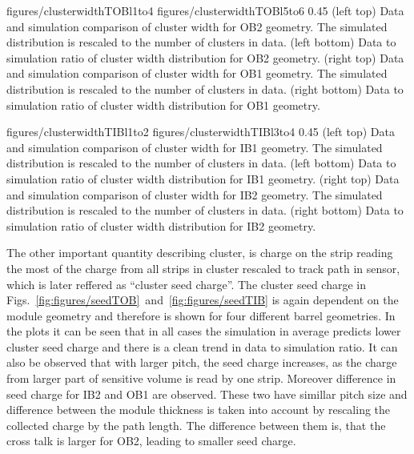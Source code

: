                  {figures/clusterwidthTOBl1to4}
                 {figures/clusterwidthTOBl5to6} %
                 {0.45}       %
                 {(left top) Data and simulation comparison of cluster width for OB2 geometry. The simulated distribution is rescaled to the number of clusters in data. (left bottom) Data to simulation ratio of cluster width distribution for OB2 geometry. (right top) Data and simulation comparison of cluster width for OB1 geometry. The simulated distribution is rescaled to the number of clusters in data. (right bottom) Data to simulation ratio of cluster width distribution for OB1 geometry. }

                 {figures/clusterwidthTIBl1to2}
                 {figures/clusterwidthTIBl3to4} %
                 {0.45}       %
                 {(left top) Data and simulation comparison of cluster width for IB1 geometry. The simulated distribution is rescaled to the number of clusters in data. (left bottom) Data to simulation ratio of cluster width distribution for IB1 geometry. (right top) Data and simulation comparison of cluster width for IB2 geometry. The simulated distribution is rescaled to the number of clusters in data. (right bottom) Data to simulation ratio of cluster width distribution for IB2 geometry. }

The other important quantity describing cluster, is charge on the strip reading the most of the charge from all strips in cluster rescaled to track path in sensor, which is later reffered as ``cluster seed charge''. The cluster seed charge in Figs.~\ref{fig:figures/seedTOB}~and~\ref{fig:figures/seedTIB} is again dependent on the module geometry and therefore is shown for four different barrel geometries. In the plots it can be seen that in all cases the simulation in average predicts lower cluster seed charge and there is a clean trend in data to simulation ratio. It can also be observed that with larger pitch, the seed charge increases, as the charge from larger part of sensitive volume is read by one strip. Moreover difference in seed charge for IB2 and OB1 are observed. These two have simillar pitch size and difference between the module thickness is taken into account by rescaling the collected charge by the path length. The difference between them is, that the cross talk is larger for OB2, leading to smaller seed charge.


